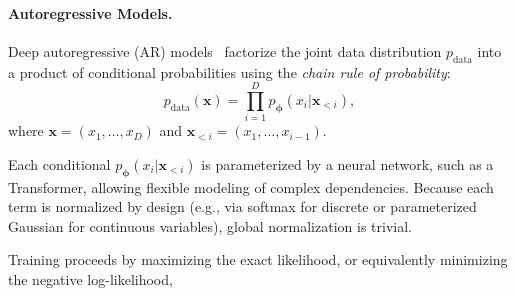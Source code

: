 




\paragraph{Autoregressive Models.}
Deep autoregressive (AR) models~\citep{frey1995does,larochelle2011neural,uria2016neural} 
factorize the joint data distribution $p_{\mathrm{data}}$ into a product of conditional probabilities using the \emph{chain rule of probability}:
\begin{equation*}
    p_{\mathrm{data}}(\mathbf{x}) = \prod_{i=1}^D p_{\bm{\phi}}(x_i |\mathbf{x}_{<i}),
\end{equation*}
where $\mathbf{x} = (x_1, \ldots, x_D)$ and $\mathbf{x}_{<i} = (x_1, \ldots, x_{i-1})$.

Each conditional $p_{\bm{\phi}}(x_i |\mathbf{x}_{<i})$ is parameterized by a neural network, such as a Transformer, allowing flexible modeling of complex dependencies. Because each term is normalized by design (e.g., via softmax for discrete or parameterized Gaussian for continuous variables), global normalization is trivial.

Training proceeds by maximizing the exact likelihood, or equivalently minimizing the negative log-likelihood,

